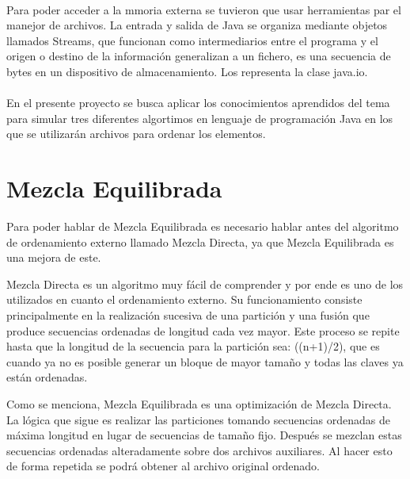 \documentclass[11pt]{article}
\begin{document}
\paragraph{}
Para poder acceder a la mmoria externa se tuvieron que usar herramientas par el manejor de archivos. La entrada y salida de Java se organiza mediante objetos llamados Streams, que funcionan como intermediarios entre el programa y el origen o destino de la información generalizan a un fichero, es una secuencia de bytes en un dispositivo de almacenamiento. Los representa la clase java.io.

\paragraph{}
En el presente proyecto se busca aplicar los conocimientos aprendidos del tema para simular tres diferentes algortimos en lenguaje de programación Java en los que se utilizarán archivos para ordenar los elementos. 


\section{Mezcla Equilibrada}
Para poder hablar de Mezcla Equilibrada es necesario hablar antes del algoritmo de ordenamiento externo llamado Mezcla Directa, ya que Mezcla Equilibrada es una mejora de este.
\par
Mezcla Directa es un algoritmo muy fácil de comprender y por ende es uno de los utilizados en cuanto el ordenamiento externo. Su funcionamiento consiste principalmente en la realización sucesiva de una partición y una fusión que produce secuencias ordenadas de longitud cada vez mayor. Este proceso se repite hasta que la longitud de la secuencia para la partición sea: ((n+1)/2), que es cuando ya no es posible generar un bloque de mayor tamaño y todas las claves ya están ordenadas.
\par
Como se menciona, Mezcla Equilibrada es una optimización de Mezcla Directa.  La lógica que sigue es realizar las particiones tomando secuencias ordenadas de máxima longitud en lugar de secuencias de tamaño fijo. Después se mezclan estas secuencias ordenadas alteradamente sobre dos archivos auxiliares. Al hacer esto de forma repetida se podrá obtener al archivo original ordenado.
\end{document}

